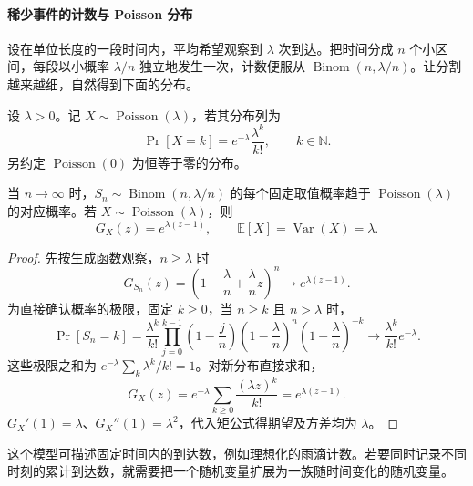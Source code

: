 \documentclass[lang=cn,a4paper,fontset=none,zihao=false,10pt,openany,twoside]{beautybook}
\numberwithin{algorithm}{chapter}
\newcommand{\N}{\mathbb N}
\begin{document}
\paragraph{稀少事件的计数与 Poisson 分布}
设在单位长度的一段时间内，平均希望观察到 $\lambda$ 次到达。把时间分成 $n$ 个小区间，每段以小概率 $\lambda/n$ 独立地发生一次，计数便服从 $\operatorname{Binom}(n,\lambda/n)$。让分割越来越细，自然得到下面的分布。
\begin{definition}[Poisson 分布]\label{def:poisson}
设 $\lambda>0$。记 $X\sim\operatorname{Poisson}(\lambda)$，若其分布列为
\[
 \Pr[X=k]=e^{-\lambda}\frac{\lambda^k}{k!},\qquad k\in\N.
\]
另约定 $\operatorname{Poisson}(0)$ 为恒等于零的分布。
\end{definition}
\begin{proposition}\label{prop:poisson-limit-pgf}
当 $n\to\infty$ 时，$S_n\sim\operatorname{Binom}(n,\lambda/n)$ 的每个固定取值概率趋于 $\operatorname{Poisson}(\lambda)$ 的对应概率。若 $X\sim\operatorname{Poisson}(\lambda)$，则
\[
 G_X(z)=e^{\lambda(z-1)},\qquad\mathbb E[X]=\operatorname{Var}(X)=\lambda.
\]
\end{proposition}
\begin{proof}
先按生成函数观察，$n\ge\lambda$ 时
\[
 G_{S_n}(z)=\left(1-\frac\lambda n+\frac\lambda n z\right)^n
 \longrightarrow e^{\lambda(z-1)}.
\]
为直接确认概率的极限，固定 $k\ge0$，当 $n\ge k$ 且 $n>\lambda$ 时，
\[
 \Pr[S_n=k]
 =\frac{\lambda^k}{k!}\prod_{j=0}^{k-1}\left(1-\frac jn\right)
 \left(1-\frac\lambda n\right)^n
 \left(1-\frac\lambda n\right)^{-k}
 \longrightarrow\frac{\lambda^k}{k!}e^{-\lambda}.
\]
这些极限之和为 $e^{-\lambda}\sum_k\lambda^k/k!=1$。对新分布直接求和，
\[
 G_X(z)=e^{-\lambda}\sum_{k\ge0}\frac{(\lambda z)^k}{k!}=e^{\lambda(z-1)}.
\]
$G_X'(1)=\lambda$、$G_X''(1)=\lambda^2$，代入矩公式得期望及方差均为 $\lambda$。
\end{proof}
\begin{center}
\end{center}
这个模型可描述固定时间内的到达数，例如理想化的雨滴计数。若要同时记录不同时刻的累计到达数，就需要把一个随机变量扩展为一族随时间变化的随机变量。
\end{document}
